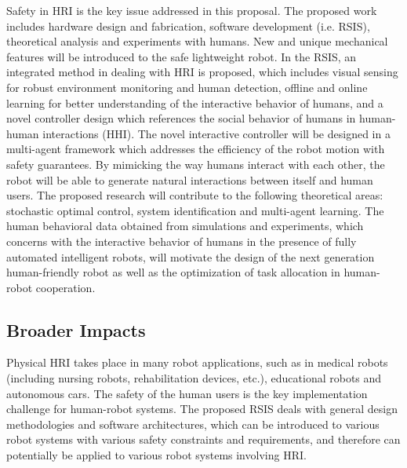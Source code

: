 Safety in HRI is the key issue addressed in this proposal. The proposed work includes hardware design and fabrication, software development (i.e. RSIS), theoretical analysis and experiments with humans. New and unique mechanical features will be introduced to the safe lightweight robot. In the RSIS, an integrated method in dealing with HRI is proposed, which includes visual sensing for robust environment monitoring and human detection, offline and online learning for better understanding of the interactive behavior of humans, and a novel controller design which references the social behavior of humans in human-human interactions (HHI). The novel interactive controller will be designed in a multi-agent framework which addresses the efficiency of the robot motion with safety guarantees. By mimicking the way humans interact with each other, the robot will be able to generate natural interactions between itself and human users. The proposed research will contribute to the following theoretical areas: stochastic optimal control, system identification and multi-agent learning. The human behavioral data obtained from simulations and experiments, which concerns with the interactive behavior of humans in the presence of fully automated intelligent robots, will motivate the design of the next generation human-friendly robot as well as the optimization of task allocation in human-robot cooperation.


\subsection{Broader Impacts}
Physical HRI takes place in many robot applications, such as in medical robots (including nursing robots, rehabilitation devices, etc.), educational robots and autonomous cars. The safety of the human users is the key implementation challenge for human-robot systems. The proposed RSIS deals with general design methodologies and software architectures, which can be introduced to various robot systems with various safety constraints and requirements, and therefore can potentially be applied to various robot systems involving HRI.

